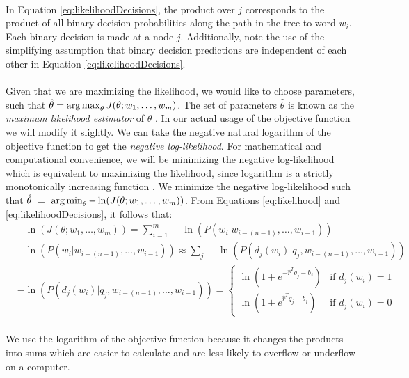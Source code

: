 \paragraph{}
In Equation \ref{eq:likelihoodDecisions}, the product over $j$ corresponds to the product of all binary decision probabilities along the path in the tree to word $w_i$. Each binary decision is made at a node $j$. Additionally, note the use of the simplifying assumption that binary decision predictions are independent of each other in Equation \ref{eq:likelihoodDecisions}.
\paragraph{}
Given that we are maximizing the likelihood, we would like to choose parameters, such that $\hat{\theta} = \operatorname*{arg\,max}_\theta J(\theta;w_1,\dots, w_m)$. The set of parameters $\hat{\theta}$ is known as the \emph{maximum likelihood estimator} of $\theta$ \cite{Elkan2013}.  In our actual usage of the objective function we will modify it slightly. We can take the negative natural logarithm of the objective function to get the \emph{negative log-likelihood}. For mathematical and computational convenience, we will be minimizing the negative log-likelihood which is equivalent to maximizing the likelihood, since logarithm is a strictly monotonically increasing function \cite{Elkan2013}. We minimize the negative log-likelihood such that  $\hat{\theta}~=~\operatorname*{arg\,min}_\theta -\ln(J(\theta;w_1,\dots, w_m))$.
From Equations \ref{eq:likelihood} and \ref{eq:likelihoodDecisions}, it follows that:
\begin{align}
&-\ln(J(\theta;w_1,\dots, w_m)) = \sum_{i=1}^{m} -\ln(P(w_i | w_{i-(n-1)},\dots, w_{i-1}))
\\
&-\ln(P(w_i | w_{i-(n-1)},\dots, w_{i-1})) \approx \sum_j - \ln(P(d_j(w_i) | q_j, w_{i-(n-1)},\dots, w_{i-1})) 
\\
&- \ln(P(d_j(w_i) | q_j, w_{i-(n-1)},\dots, w_{i-1})) = 
\begin{cases}
  \ln (1 + e^{-\hat{r}^T q_{j} -b_{j}}) 	      & \text{if } d_j(w_i)  = 1 \\
  \ln (1 + e^{\hat{r}^T q_{j} +b_{j}})    & \text{if } d_j(w_i) = 0
  \end{cases} \nonumber
\end{align}

\paragraph{}
We use the logarithm of the objective function because it changes the products into sums which are easier to calculate and are less likely to overflow or underflow on a computer.

